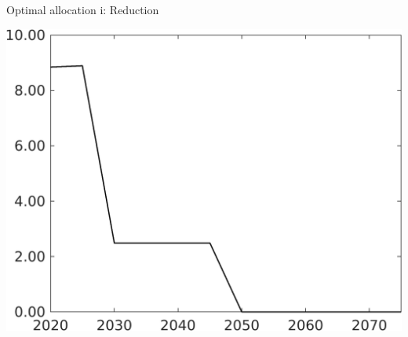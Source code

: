 \documentclass[11pt,aspectratio=169]{beamer}
\begin{document}
\begin{frame}{Optimal allocation i: Reduction}
\begin{minipage}[]{0.32\textwidth}
	\end{minipage}
	\begin{minipage}[]{0.32\textwidth}
		\includegraphics[width=1\textwidth]{../codding_model/own_basedOnFried/optimalPol_elastS_DisuSci/figures/all_1705/Single_OPT_T_NoTaus_Emnet_spillover0_sep1_BN1_ineq0_red0_etaa0.79.png}
	\end{minipage}
	

\end{frame}
\end{document}
